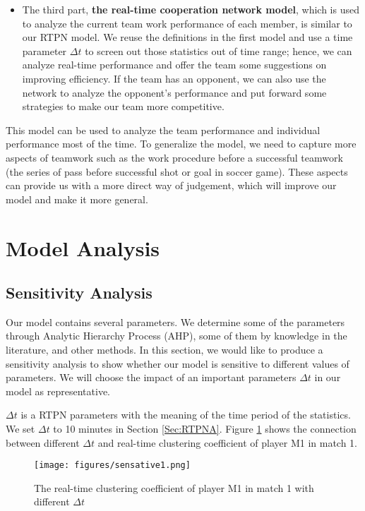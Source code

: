 \documentclass{mcmthesis}
\begin{document}
\begin{itemize}
\begin{itemize}
        \item The third part, \textbf{the real-time cooperation network model}, which is used to analyze the current team work performance of each member, is similar to our RTPN model. We reuse the definitions in the first model and use a time parameter $\Delta{t}$ to screen out those statistics out of time range; hence, we can analyze real-time performance and offer the team some suggestions on improving efficiency. If the team has an opponent, we can also use the network to analyze the opponent's performance and put forward some strategies to make our team more competitive.
    \end{itemize}
    This model can be used to analyze the team performance and individual performance most of the time. To generalize the model, we need to capture more aspects of teamwork such as the work procedure before a successful teamwork (the series of pass before successful shot or goal in soccer game). These aspects can provide us with a more direct way of judgement, which will improve our model and make it more general.
\end{itemize}


\section{Model Analysis}\label{Sec-Analysis}
\subsection{Sensitivity Analysis}
Our model contains several parameters. We determine some of the parameters through Analytic Hierarchy Process (AHP), some of them by knowledge in the literature, and other methods. In this section, we would like to produce a sensitivity analysis to show whether our model is sensitive to different values of parameters. We will choose the impact of an important parameters $\Delta{t}$ in our model as representative.

$\Delta{t}$ is a RTPN parameters with the meaning of the time period of the statistics. We set $\Delta{t}$ to 10 minutes in Section \ref{Sec:RTPNA}. Figure \ref{fig:sensative} shows the connection between different $\Delta{t}$ and real-time clustering coefficient of player M1 in match 1.

\begin{figure}[htbp]
    \centering
    \texttt{[image: figures/sensative1.png]}
    \caption{The real-time clustering coefficient of player M1 in match 1 with different $\Delta{t}$}
    \label{fig:sensative}
\end{figure}
\end{document}
